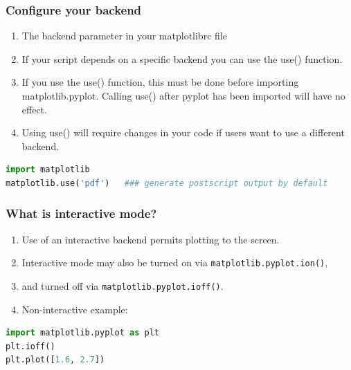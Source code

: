 \documentclass[UTF8,a4paper,12pt]{ctexart}  %
\providecommand{\tightlist}{\setlength{\itemsep}{0pt}\setlength{\parskip}{0pt}}
\newcommand{\passthrough}[1]{\lstset{mathescape=false}#1\lstset{mathescape=true}}
\begin{document}
\hypertarget{configure-your-backend}{%
\subsubsection{Configure your backend}\label{configure-your-backend}}

\begin{enumerate}
\def\labelenumi{\arabic{enumi}.}
\tightlist
\item
  The backend parameter in your matplotlibrc file
\item
  If your script depends on a specific backend you can use the use()
  function.
\item
  If you use the use() function, this must be done before importing
  matplotlib.pyplot. Calling use() after pyplot has been imported will
  have no effect.
\item
  Using use() will require changes in your code if users want to use a
  different backend.
\end{enumerate}

\begin{lstlisting}[language=Python]
import matplotlib
matplotlib.use('pdf')   ### generate postscript output by default
\end{lstlisting}

\hypertarget{what-is-interactive-mode}{%
\subsubsection{What is interactive mode?}\label{what-is-interactive-mode}}

\begin{enumerate}
\def\labelenumi{\arabic{enumi}.}
\tightlist
\item
  Use of an interactive backend permits plotting to the screen.
\item
  Interactive mode may also be turned on via
  \passthrough{\lstinline!matplotlib.pyplot.ion()!},
\item
  and turned off via \passthrough{\lstinline!matplotlib.pyplot.ioff()!}.
\item
  Non-interactive example:
\end{enumerate}

\begin{lstlisting}[language=Python]
import matplotlib.pyplot as plt
plt.ioff()
plt.plot([1.6, 2.7])
\end{lstlisting}
\end{document}
